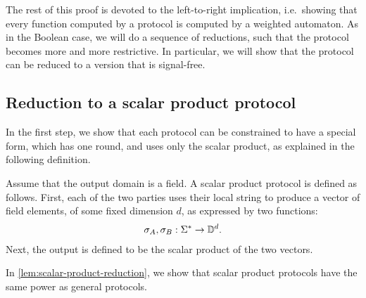 The rest of this proof is devoted to the left-to-right implication, i.e.~showing that every function computed by a protocol is computed by a weighted automaton. As in the Boolean case, we will do a sequence of reductions, such that the protocol becomes more and more restrictive. In particular, we will show that the protocol can be reduced to a version that is signal-free.

\subsection{Reduction to a scalar product protocol}
\label{sec:reduction-to-scalar-product-protocols}

In the first step, we show that each protocol can be constrained to have a special form, which has one round, and uses only the scalar product,  as explained in the following definition. 
\begin{definition} \label{def:scalar-product-protocol}
    Assume that the output domain is a field.
    A scalar product protocol is defined as follows. First, each of the two parties uses their local string to  produce a vector of field elements, of some fixed dimension $d$, as expressed by two functions: 
    \begin{align*}
    \sigma_A, \sigma_B : \Sigma^* \to \mathbb D^d.
    \end{align*}
    Next, the output is defined to be the scalar product of the two vectors. 
\end{definition}

In \cref{lem:scalar-product-reduction}, we show that scalar product protocols have the same power as general protocols. 

